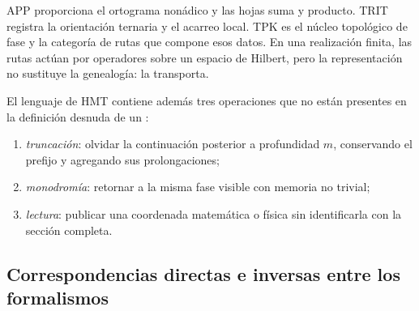 APP proporciona el ortograma nonádico y las hojas suma y producto. TRIT
registra la orientación ternaria y el acarreo local. TPK es el núcleo
topológico de fase y la categoría de rutas que compone esos datos. En una
realización finita, las rutas actúan por operadores sobre un espacio de
Hilbert, pero la representación no sustituye la genealogía: la transporta.

El lenguaje de HMT contiene además tres operaciones que no están presentes en
la definición desnuda de un \QMS:

\begin{enumerate}
  \item \emph{truncación}: olvidar la continuación posterior a profundidad
  $m$, conservando el prefijo y agregando sus prolongaciones;
  \item \emph{monodromía}: retornar a la misma fase visible con memoria no
  trivial;
  \item \emph{lectura}: publicar una coordenada matemática o física sin
  identificarla con la sección completa.
\end{enumerate}

\Needspace{.74\textheight}
\subsection{Correspondencias directas e inversas entre los formalismos}

